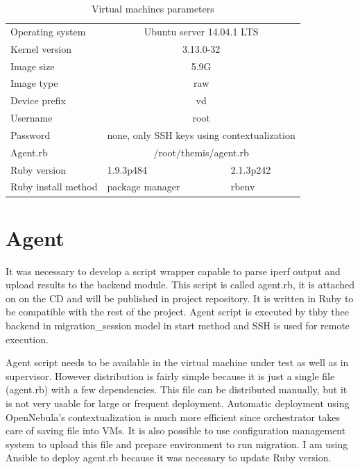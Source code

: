 \begin{table}[htb]
\begin{center}
	\caption{Virtual machines parameters}
	\label{tab:vm-params}
	\begin{tabular}{|l|l|l|}
	\hline
	\Th{Parameter} & \Th{VM for migration} & \Th{Supervisor} \\
	\hline
	Operating system & \multicolumn{2}{c|}{Ubuntu server 14.04.1 LTS} \\
	\hline
	Kernel version & \multicolumn{2}{c|}{3.13.0-32} \\
	\hline
	Image size & \multicolumn{2}{c|}{5.9G} \\
	\hline
	Image type & \multicolumn{2}{c|}{raw} \\
	\hline
	Device prefix & \multicolumn{2}{c|}{vd} \\
	\hline
	Username & \multicolumn{2}{c|}{root} \\
	\hline
	Password & \multicolumn{2}{c|}{none, only \Ac{SSH} keys using contextualization}\\
	\hline
	Agent.rb & \multicolumn{2}{c|}{/root/themis/agent.rb}\\
	\hline
	Ruby version & 1.9.3p484 & 2.1.3p242 \\
	\hline
	Ruby install method & package manager & rbenv \\
	\hline
	\end{tabular}
\end{center}
\end{table}


\section{Agent}
It was necessary to develop a script wrapper capable to parse iperf output and upload results to the backend module. This script is called agent.rb, it is attached on on the CD and will be published in project repository. It is written in Ruby to be compatible with the rest of the project. Agent script is executed by thby thee backend in migration\_session model in start method and \Ac{SSH} is used for remote execution.

Agent script needs to be available in the virtual machine under test as well as in supervisor. However distribution is fairly simple because it is just a single file (agent.rb) with a few dependencies. This file can be distributed manually, but it is not very usable for large or frequent deployment. Automatic deployment using OpenNebula's contextualization is much more efficient since orchestrator takes care of saving file into \Ac{VM}s. 
It is also possible to use configuration management system to upload this file and prepare environment to run migration. I am using Ansible to deploy agent.rb because it was necessary to update Ruby version. 

